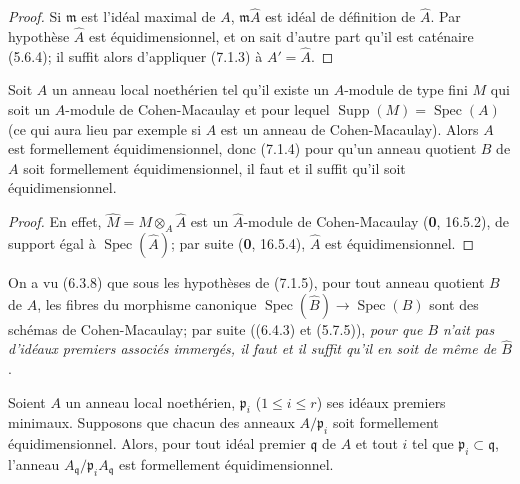 \begin{proof}
Si $\mathfrak m$ est l'idéal maximal de $A$, $\mathfrak m\widehat A$ est
idéal de définition de $\widehat A$. Par hypothèse $\widehat A$ est
équidimensionnel, et on sait d'autre part qu'il est caténaire (5.6.4); il
suffit alors d'appliquer (7.1.3) à $A'=\widehat A$.
\end{proof}

\begin{corollary}[7.1.5]
\label{IV.2.s7.1.5-fr}
Soit $A$ un anneau local noethérien tel qu'il existe un $A$-module de type
fini $M$ qui soit un $A$-module de Cohen-Macaulay et pour lequel
$\operatorname{Supp}(M)=\operatorname{Spec}(A)$ \textup{(ce qui aura lieu par
exemple si $A$ est un anneau de Cohen-Macaulay)}. Alors $A$ est formellement
équidimensionnel, donc \textup{(7.1.4)} pour qu'un anneau quotient $B$ de $A$ soit
formellement équidimensionnel, il faut et il suffit qu'il soit
équidimensionnel.
\end{corollary}

\begin{proof}
En effet, $\widehat M=M\otimes_A\widehat A$ est un $\widehat A$-module de
Cohen-Macaulay (\textbf{0}, 16.5.2), de support égal à
$\operatorname{Spec}(\widehat A)$; par suite (\textbf{0}, 16.5.4), $\widehat A$ est
équidimensionnel.
\end{proof}

\begin{remark}[7.1.6]
\label{IV.2.s7.1.6-fr}
On a vu (6.3.8) que sous les hypothèses de (7.1.5), pour tout anneau quotient
$B$ de $A$, les fibres du morphisme canonique
$\operatorname{Spec}(\widehat B)\to\operatorname{Spec}(B)$ sont des schémas
de Cohen-Macaulay; par suite ((6.4.3) et (5.7.5)), \emph{pour que $B$ n'ait
pas d'idéaux premiers associés immergés, il faut et il suffit qu'il en soit
de même de $\widehat B$}.
\end{remark}

\begin{lemma}[7.1.7]
\label{IV.2.s7.1.7-fr}
Soient $A$ un anneau local noethérien, $\mathfrak p_i$
($1\leqslant i\leqslant r$) ses idéaux premiers minimaux. Supposons que
chacun des anneaux $A/\mathfrak p_i$ soit formellement équidimensionnel.
Alors, pour tout idéal premier $\mathfrak q$ de $A$ et tout $i$ tel que
$\mathfrak p_i\subset\mathfrak q$, l'anneau
$A_{\mathfrak q}/\mathfrak p_iA_{\mathfrak q}$ est formellement
équidimensionnel.
\end{lemma}

